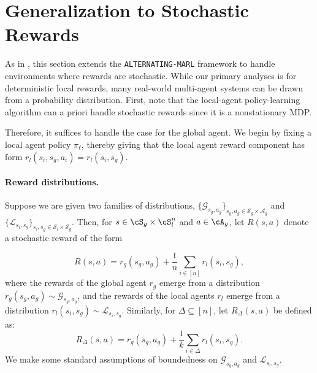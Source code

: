 \documentclass{article}
\theoremstyle{plain}
\theoremstyle{definition}
\begin{document}
 

\section{Generalization to Stochastic Rewards}
\label{sec: generalize to stochastic rewards}

As in \citet{anand2025meanfield}, this section extends the \texttt{ALTERNATING-MARL} framework to handle environments where rewards are stochastic. While our primary analyses is for deterministic local rewards, many real-world multi-agent systems can be drawn from a probability distribution. First, note that the local-agent policy-learning algorithm can a priori handle stochastic rewards since it is a nonstationary MDP. 

Therefore, it suffices to handle the case for the global agent. We begin by fixing a local agent policy $\pi_\ell$, thereby giving that the local agent reward component has form $r_l(s_i, s_g, a_i) = r_l(s_i, s_g)$.

\label{stochastic generalization}

\paragraph{Reward distributions.} Suppose we are given two families of distributions, $\{\mathcal{G}_{s_g,a_g}\}_{s_g,a_g\in\mathcal{S}_g\times\mathcal{A}_g}$ and $\{\mathcal{L}_{s_i,s_g}\}_{s_i,s_g\in\mathcal{S}_l\times\mathcal{S}_g}$. Then, for $s\in\cS_g\times\cS_l^n$ and $a\in\cA_g$, let $R(s,a)$ denote a stochastic reward of the form 

\begin{equation}R(s,a) = r_g(s_g,a_g) + \frac1n  \sum_{i\in[n]}r_l(s_i,s_g),\end{equation}
where the rewards of the global agent $r_g$ emerge from a distribution $r_g(s_g,a_g)\sim \mathcal{G}_{s_g,a_g}$, and the rewards of the local agents $r_l$ emerge from a distribution $r_l(s_i,s_g)\sim \mathcal{L}_{s_i,s_g}$. Similarly, for $\Delta\subseteq [n]$, let $R_\Delta(s,a)$ be defined as:
\begin{equation}R_\Delta(s,a) = r_g(s_g,a_g) + \frac1k \sum_{i\in\Delta}r_l(s_i,s_g ).\end{equation}
We make some standard assumptions of boundedness on $\mathcal{G}_{s_g,a_g}$ and $\mathcal{L}_{s_i,s_g}$.\\
\end{document}
